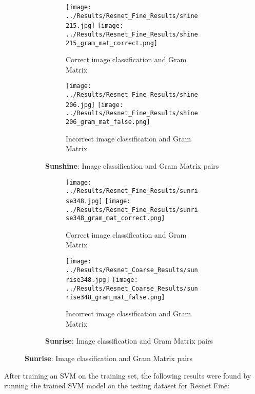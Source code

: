 \documentclass{article}
\begin{document}
\begin{figure}[H]
    \begin{subfigure}{\linewidth}
        \centering
        \begin{subfigure}{0.49\linewidth}
            \centering
            \texttt{[image: ../Results/Resnet\_Fine\_Results/shine215.jpg]}
            \texttt{[image: ../Results/Resnet\_Fine\_Results/shine215\_gram\_mat\_correct.png]}
            \caption*{Correct image classification and Gram Matrix}
        \end{subfigure}
        \begin{subfigure}{0.49\linewidth}
            \centering
            \texttt{[image: ../Results/Resnet\_Fine\_Results/shine206.jpg]}
            \texttt{[image: ../Results/Resnet\_Fine\_Results/shine206\_gram\_mat\_false.png]}
            \caption*{Incorrect image classification and Gram Matrix}
        \end{subfigure}
        \caption*{\textbf{Sunshine}: Image classification and Gram Matrix pairs}
    \end{subfigure}
    \hfill

    \begin{subfigure}{\linewidth}
        \centering
        \begin{subfigure}{0.49\linewidth}
            \centering
            \texttt{[image: ../Results/Resnet\_Fine\_Results/sunrise348.jpg]}
            \texttt{[image: ../Results/Resnet\_Fine\_Results/sunrise348\_gram\_mat\_correct.png]}
            \caption*{Correct image classification and Gram Matrix}
        \end{subfigure}
        \begin{subfigure}{0.49\linewidth}
            \centering
            \texttt{[image: ../Results/Resnet\_Coarse\_Results/sunrise348.jpg]}
            \texttt{[image: ../Results/Resnet\_Coarse\_Results/sunrise348\_gram\_mat\_false.png]}
            \caption*{Incorrect image classification and Gram Matrix}
        \end{subfigure}
        \caption*{\textbf{Sunrise}: Image classification and Gram Matrix pairs}
    \end{subfigure}
\end{figure}

After training an SVM on the training set, the following results were found by running the trained SVM model on the testing dataset for Resnet Fine:
\end{document}
